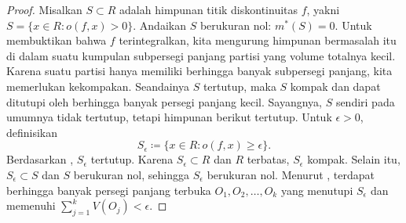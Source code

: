 \begin{proof}
Misalkan $S \subset R$ adalah himpunan titik diskontinuitas $f$, yakni
$S = \bigl\{ x \in R : o(f,x) > 0 \bigr\}$.
Andaikan $S$ berukuran nol: $m^*(S) = 0$.
Untuk membuktikan bahwa $f$ terintegralkan, kita mengurung himpunan bermasalah
itu di dalam suatu kumpulan subpersegi panjang partisi yang volume totalnya
kecil. Karena suatu partisi hanya memiliki berhingga banyak
subpersegi panjang, kita memerlukan kekompakan. Seandainya $S$ tertutup, maka
$S$ kompak dan dapat ditutupi oleh berhingga banyak persegi panjang kecil.
Sayangnya, $S$ sendiri pada umumnya tidak tertutup, tetapi himpunan berikut
tertutup. Untuk $\epsilon > 0$, definisikan
\begin{equation*}
S_\epsilon \coloneqq \bigl\{ x \in R : o(f,x) \geq \epsilon \bigr\} .
\end{equation*}
Berdasarkan , $S_\epsilon$ tertutup.
Karena $S_\epsilon\subset R$ dan $R$ terbatas, $S_\epsilon$ kompak. Selain itu,
$S_\epsilon \subset S$ dan $S$ berukuran nol,
sehingga $S_\epsilon$ berukuran nol.
Menurut , terdapat berhingga banyak persegi panjang
terbuka $O_1,O_2,\ldots,O_k$ yang menutupi $S_\epsilon$ dan memenuhi
$\sum_{j=1}^k V(O_j) < \epsilon$.


\end{proof}
